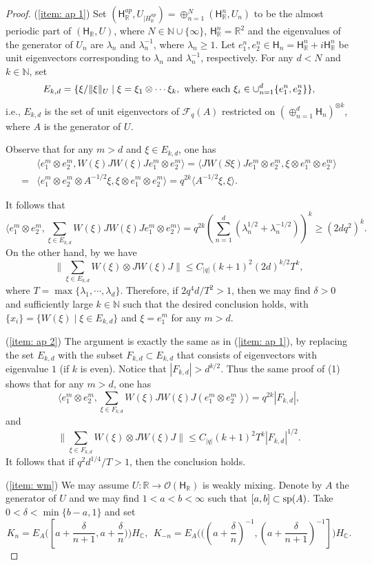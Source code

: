 \documentclass[a4paper,11pt]{amsart}
\theoremstyle{definition}
\newcommand{\C}{{\mathbb C}}
\newcommand{\N}{{\mathbb N}}
\newcommand{\R}{{\mathbb R}}
\newcommand{\cF}{{\mathcal F}}
\newcommand{\cO}{{\mathcal O}}
\newcommand{\sH}{\mathsf{H}}
\newcommand{\ot}{\otimes}
\begin{document}
\begin{proof}
(\ref{item: ap 1})
Set $(\sH_\R^{ap}, U_{\mid H_\R^{ap}})=\oplus_{n=1}^N (\sH_\R^n, U_n)$ to be the almost periodic part of $(\sH_\R, U)$,
	where $N\in \N\cup \{\infty\}$, 
	$\sH_\R^n=\R^2$ and the eigenvalues of the generator of $U_n$ are $\lambda_n$ and $\lambda_n^{-1}$, where $\lambda_n\geq 1$.
Let $e_1^n, e_2^n\in \sH_n=\sH_\R^n+i \sH_\R^n$ be unit eigenvectors corresponding to $\lambda_n$ and $\lambda_n^{-1}$, respectively.
For any $d<N$ and $k\in \N$, set
$$
E_{k,d}=\{\xi/\|\xi\|_U \mid \xi=\xi_1\ot \cdots \xi_k,\ {\rm where\ each\ } \xi_i\in \cup_{n=1}^d\{e_1^n, e_2^n\}\},
$$
i.e., $E_{k,d}$ is the set of unit eigenvectors of $\cF_q(A)$ restricted on $(\oplus_{n=1}^d \sH_n)^{\ot k}$, where $A$ is the generator of $U$.

Observe that for any $m>d$ and $\xi\in E_{k,d}$, one has
\[\begin{aligned}
&\langle e_1^m\ot e_2^m, W(\xi) JW(\xi)J e_1^m\ot e_2^m\rangle=\langle JW(S\xi)Je_1^m\ot e_2^m, \xi\ot e_1^m\ot e_2^m\rangle\\
	=&\langle e_1^m\ot e_2^m\ot A^{-1/2}\xi, \xi\ot e_1^m\ot e_2^m\rangle
	=q^{2k}\langle A^{-1/2}\xi, \xi\rangle.
\end{aligned}\]

It follows that
$$
\langle e_1^m\ot e_2^m, \sum_{\xi\in E_{k,d}} W(\xi) JW(\xi)J e_1^m \ot e_2^m\rangle=q^{2k} (\sum_{n=1}^d (\lambda_n^{1/2}+\lambda_n^{-1/2}))^k\geq (2dq^2)^k.
$$
On the other hand, by \cite{Nou04} we have
$$\|\sum_{\xi\in E_{k,d}} W(\xi)\ot JW(\xi)J\|\leq C_{|q|}(k+1)^2 (2d)^{k/2} T^k,$$
where $T=\max\{\lambda_1,\cdots, \lambda_d\}$.
Therefore, if $2q^4d/T^2>1$, then we may find $\delta>0$ and sufficiently large $k\in \N$
	such that the desired conclusion holds, with $\{x_i\}=\{W(\xi)\mid \xi\in E_{k,d}\}$
	and $\xi=e_1^m$ for any $m>d$.
	
(\ref{item: ap 2}) The argument is exactly the same as in (\ref{item: ap 1}), by replacing the set $E_{k,d}$ with the subset $F_{k,d}\subset E_{k,d}$ that consists of eigenvectors with eigenvalue $1$ (if $k$ is even).
Notice that $|F_{k,d}|>d^{k/2}$.
Thus the same proof of (1) shows that for any $m>d$, one has
$$
\langle e_1^m\ot e_2^m, \sum_{\xi\in F_{k,d}} W(\xi) JW(\xi)J (e_1^m\ot e_2^m)\rangle=q^{2k} |F_{k,d}|,
$$
and
$$
\|\sum_{\xi\in F_{k,d}} W(\xi)\ot JW(\xi)J\|\leq C_{|q|} (k+1)^2 T^k |F_{k,d}|^{1/2}.
$$
It follows that if $q^2 d^{1/4}/T>1$, then the conclusion holds.

(\ref{item: wm}) We may assume $U: \R\to \cO(\sH_\R)$ is weakly mixing. 
Denote by $A$ the generator of $U$ and we may find $1<a<b<\infty$ such that $[a,b]\subset {\rm sp}(A)$.
Take $0<\delta<\min\{b-a, 1\}$ and set
$$K_n=E_A\big([a+\frac{\delta}{n+1}, a+\frac{\delta}{n})\big)H_\C,\ \ 
	K_{-n}=E_A \big( ( ( a+\frac{\delta}{n})^{-1}, (a+\frac{\delta}{n+1})^{-1}]\big)H_\C.$$


\end{proof}
\end{document}
